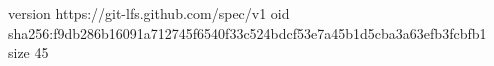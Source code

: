version https://git-lfs.github.com/spec/v1
oid sha256:f9db286b16091a712745f6540f33c524bdcf53e7a45b1d5cba3a63efb3fcbfb1
size 45
